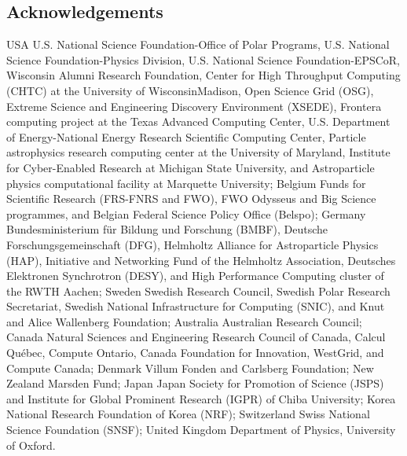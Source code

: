 \documentclass[a4paper,11pt]{article}
\begin{document}
\subsection*{Acknowledgements}

\noindent
USA {\textendash} U.S. National Science Foundation-Office of Polar Programs,
U.S. National Science Foundation-Physics Division,
U.S. National Science Foundation-EPSCoR,
Wisconsin Alumni Research Foundation,
Center for High Throughput Computing (CHTC) at the University of Wisconsin{\textendash}Madison,
Open Science Grid (OSG),
Extreme Science and Engineering Discovery Environment (XSEDE),
Frontera computing project at the Texas Advanced Computing Center,
U.S. Department of Energy-National Energy Research Scientific Computing Center,
Particle astrophysics research computing center at the University of Maryland,
Institute for Cyber-Enabled Research at Michigan State University,
and Astroparticle physics computational facility at Marquette University;
Belgium {\textendash} Funds for Scientific Research (FRS-FNRS and FWO),
FWO Odysseus and Big Science programmes,
and Belgian Federal Science Policy Office (Belspo);
Germany {\textendash} Bundesministerium f{\"u}r Bildung und Forschung (BMBF),
Deutsche Forschungsgemeinschaft (DFG),
Helmholtz Alliance for Astroparticle Physics (HAP),
Initiative and Networking Fund of the Helmholtz Association,
Deutsches Elektronen Synchrotron (DESY),
and High Performance Computing cluster of the RWTH Aachen;
Sweden {\textendash} Swedish Research Council,
Swedish Polar Research Secretariat,
Swedish National Infrastructure for Computing (SNIC),
and Knut and Alice Wallenberg Foundation;
Australia {\textendash} Australian Research Council;
Canada {\textendash} Natural Sciences and Engineering Research Council of Canada,
Calcul Qu{\'e}bec, Compute Ontario, Canada Foundation for Innovation, WestGrid, and Compute Canada;
Denmark {\textendash} Villum Fonden and Carlsberg Foundation;
New Zealand {\textendash} Marsden Fund;
Japan {\textendash} Japan Society for Promotion of Science (JSPS)
and Institute for Global Prominent Research (IGPR) of Chiba University;
Korea {\textendash} National Research Foundation of Korea (NRF);
Switzerland {\textendash} Swiss National Science Foundation (SNSF);
United Kingdom {\textendash} Department of Physics, University of Oxford.
\end{document}
